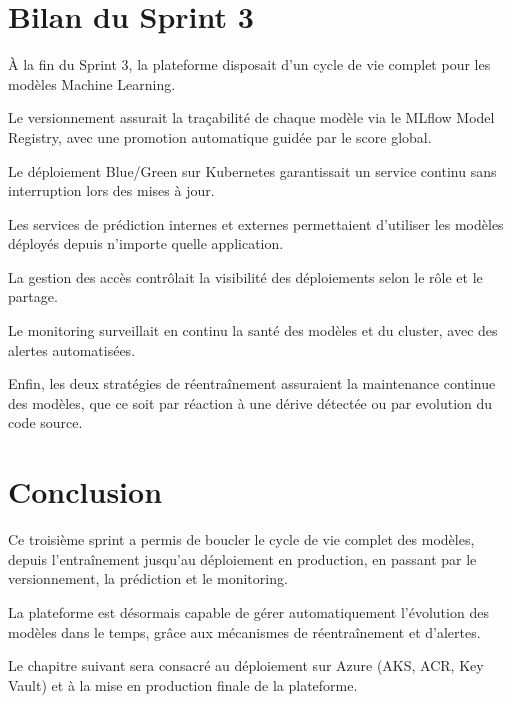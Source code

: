 \section{Bilan du Sprint 3}
\label{sec:sprint3-bilan}

À la fin du Sprint 3, la plateforme disposait d'un cycle de vie
complet pour les modèles Machine Learning.

Le versionnement assurait la traçabilité de chaque modèle via le
MLflow Model Registry, avec une promotion automatique guidée par le
score global.

Le déploiement Blue/Green sur Kubernetes garantissait un service
continu sans interruption lors des mises à jour.

Les services de prédiction internes et externes permettaient
d'utiliser les modèles déployés depuis n'importe quelle application.

La gestion des accès contrôlait la visibilité des déploiements selon
le rôle et le partage.

Le monitoring surveillait en continu la santé des modèles et du
cluster, avec des alertes automatisées.

Enfin, les deux stratégies de réentraînement assuraient la
maintenance continue des modèles, que ce soit par réaction à une
dérive détectée ou par evolution du code source.



\section{Conclusion}
\label{sec:ch5-conclusion}

Ce troisième sprint a permis de boucler le cycle de vie complet des
modèles, depuis l'entraînement jusqu'au déploiement en production,
en passant par le versionnement, la prédiction et le monitoring.

La plateforme est désormais capable de gérer automatiquement
l'évolution des modèles dans le temps, grâce aux mécanismes de
réentraînement et d'alertes.

Le chapitre suivant sera consacré au déploiement sur Azure (AKS,
ACR, Key Vault) et à la mise en production finale de la plateforme.

